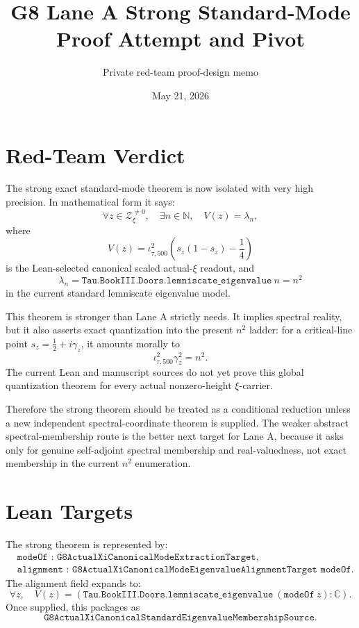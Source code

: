 \documentclass[11pt]{article}
\title{G8 Lane A Strong Standard-Mode Proof Attempt and Pivot}
\author{Private red-team proof-design memo}
\date{May 21, 2026}
\begin{document}
\maketitle

\section*{Red-Team Verdict}

The strong exact standard-mode theorem is now isolated with very high
precision.  In mathematical form it says:
\[
  \forall z\in \mathcal Z_{\xi}^{\neq 0},\quad
  \exists n\in\mathbb N,\quad
  V(z)=\lambda_n,
\]
where
\[
  V(z)=\iota_{\tau,500}^2
  \left(s_z(1-s_z)-\frac14\right)
\]
is the Lean-selected canonical scaled actual-\(\xi\) readout, and
\[
  \lambda_n =
  \texttt{Tau.BookIII.Doors.lemniscate\_eigenvalue}\ n
  =
  n^2
\]
in the current standard lemniscate eigenvalue model.

This theorem is stronger than Lane A strictly needs.  It implies spectral
reality, but it also asserts exact quantization into the present \(n^2\) ladder:
for a critical-line point \(s_z=\frac12+i\gamma_z\), it amounts morally to
\[
  \iota_{\tau,500}^2\gamma_z^2=n^2.
\]
The current Lean and manuscript sources do not yet prove this global
quantization theorem for every actual nonzero-height \(\xi\)-carrier.

Therefore the strong theorem should be treated as a conditional reduction unless
a new independent spectral-coordinate theorem is supplied.  The weaker abstract
spectral-membership route is the better next target for Lane A, because it asks
only for genuine self-adjoint spectral membership and real-valuedness, not exact
membership in the current \(n^2\) enumeration.

\section*{Lean Targets}

The strong theorem is represented by:
\[
\begin{aligned}
&\texttt{modeOf : G8ActualXiCanonicalModeExtractionTarget},\\
&\texttt{alignment :
G8ActualXiCanonicalModeEigenvalueAlignmentTarget modeOf}.
\end{aligned}
\]
The alignment field expands to:
\[
  \forall z,\quad
  V(z)
  =
  \left(
  \texttt{Tau.BookIII.Doors.lemniscate\_eigenvalue}\ (\texttt{modeOf}\ z)
  :\mathbb C\right).
\]
Once supplied, this packages as
\[
  \texttt{G8ActualXiCanonicalStandardEigenvalueMembershipSource}.
\]
\end{document}
